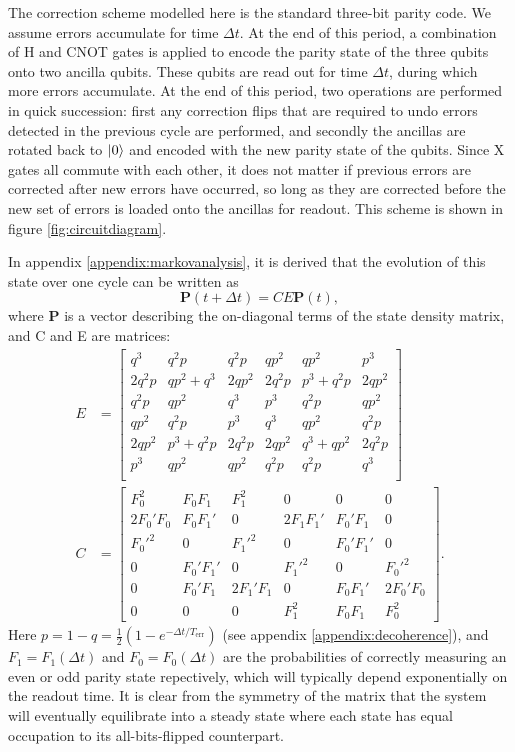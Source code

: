 \documentclass{report}
\begin{document}
The correction scheme modelled here is the standard three-bit parity code. We assume errors accumulate for time $\Delta t$. At the end of this period, a combination of H and CNOT gates is applied to encode the parity state of the three qubits onto two ancilla qubits. These qubits are read out for time $\Delta t$, during which more errors accumulate. At the end of this period, two operations are performed in quick succession: first any correction flips that are required to undo errors detected in the previous cycle are performed, and secondly the ancillas are rotated back to $\ket{0}$ and encoded with the new parity state of the qubits. Since X gates all commute with each other, it does not matter if previous errors are corrected after new errors have occurred, so long as they are corrected before the new set of errors is loaded onto the ancillas for readout. This scheme is shown in figure \ref{fig:circuitdiagram}.

In appendix \ref{appendix:markovanalysis}, it is derived that the evolution of this state over one cycle can be written as 
\begin{equation*}
    \mathbf{P}(t + \Delta t) = CE\mathbf{P}(t),
\end{equation*} where $\mathbf{P}$ is a vector describing the on-diagonal terms of the state density matrix, and C and E are matrices:
\begin{align*}
    E &=     
    \begin{bmatrix}
        q^3& q^2p& q^2p& qp^2& qp^2& p^3 \\
        2 q^2p& qp^2 + q^3& 2 qp^2& 2 q^2p& p^3 + q^2p& 2 qp^2\\
        q^2p& qp^2& q^3& p^3& q^2p& qp^2\\
        qp^2& q^2p& p^3& q^3& qp^2& q^2p\\
        2 qp^2& p^3 + q^2p& 2 q^2p& 2 qp^2& q^3 + qp^2& 2 q^2p\\
        p^3& qp^2& qp^2& q^2p& q^2p& q^3\\
    \end{bmatrix}\\
    C &= 
    \begin{bmatrix}
        F_0^2 & F_0 F_1 & F_1^2 & 0 & 0 & 0 \\
        2F_0'F_0 & F_0 F_1' & 0 & 2F_1 F_1' & F_0' F_1 & 0\\
        F_0'^2 & 0 & F_1'^2 & 0 & F_0' F_1' & 0 \\
        0 & F_0' F_1' & 0 & F_1'^2 & 0 &F_0'^2 \\
        0 &F_0' F_1 & 2F_1' F_1&0&F_0F_1'&2F_0'F_0 \\
        0&0&0& F_1^2 &F_0 F_1 & F_0^2
    \end{bmatrix}.
\end{align*} Here $p = 1-q = \frac{1}{2}(1-e^{-\Delta t /T_{\text{err}}})$ (see appendix \ref{appendix:decoherence}), and $F_1 = F_1(\Delta t)$ and $F_0 = F_0(\Delta t)$ are the probabilities of correctly measuring an even or odd parity state repectively, which will typically depend exponentially on the readout time. It is clear from the symmetry of the matrix that the system will eventually equilibrate into a steady state where each state has equal occupation to its all-bits-flipped counterpart.
\end{document}
